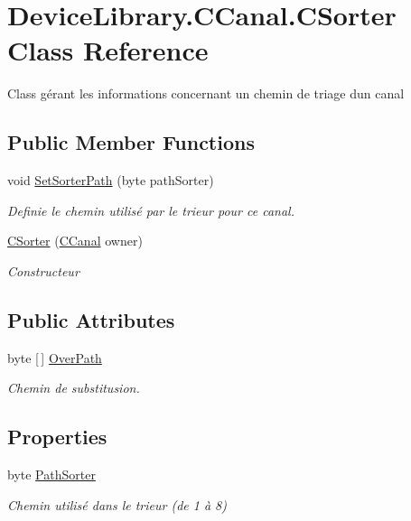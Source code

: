 \hypertarget{class_device_library_1_1_c_canal_1_1_c_sorter}{}\section{Device\+Library.\+C\+Canal.\+C\+Sorter Class Reference}
\label{class_device_library_1_1_c_canal_1_1_c_sorter}


Class gérant les informations concernant un chemin de triage d\textquotesingle{}un canal  


\subsection*{Public Member Functions}
\begin{DoxyCompactItemize}
\item 
void \mbox{\hyperlink{class_device_library_1_1_c_canal_1_1_c_sorter_a3e3bd854bcc07374dbf12baefe6afea4}{Set\+Sorter\+Path}} (byte path\+Sorter)
\begin{DoxyCompactList}\small\item\em Definie le chemin utilisé par le trieur pour ce canal. \end{DoxyCompactList}\item 
\mbox{\hyperlink{class_device_library_1_1_c_canal_1_1_c_sorter_a45e0fa5899f6d78de268976c1a9f1887}{C\+Sorter}} (\mbox{\hyperlink{class_device_library_1_1_c_canal}{C\+Canal}} owner)
\begin{DoxyCompactList}\small\item\em Constructeur \end{DoxyCompactList}\end{DoxyCompactItemize}
\subsection*{Public Attributes}
\begin{DoxyCompactItemize}
\item 
byte \mbox{[}$\,$\mbox{]} \mbox{\hyperlink{class_device_library_1_1_c_canal_1_1_c_sorter_af92b28db721034603d820227b5b544fe}{Over\+Path}}
\begin{DoxyCompactList}\small\item\em Chemin de substitusion. \end{DoxyCompactList}\end{DoxyCompactItemize}
\subsection*{Properties}
\begin{DoxyCompactItemize}
\item 
byte \mbox{\hyperlink{class_device_library_1_1_c_canal_1_1_c_sorter_a9fefa95f8e5231ef8361faffe80c50a1}{Path\+Sorter}}
\begin{DoxyCompactList}\small\item\em Chemin utilisé dans le trieur (de 1 à 8) \end{DoxyCompactList}\end{DoxyCompactItemize}


